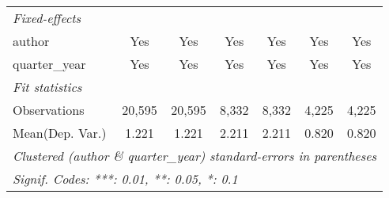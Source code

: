 \begin{tabular}{lcccccc}
   \midrule
   \emph{Fixed-effects}\\
   author                                & Yes           & Yes           & Yes           & Yes           & Yes           & Yes\\  
   quarter\_year                         & Yes           & Yes           & Yes           & Yes           & Yes           & Yes\\  
   \midrule
   \emph{Fit statistics}\\
   Observations                          & 20,595        & 20,595        & 8,332         & 8,332         & 4,225         & 4,225\\  
Mean(Dep. Var.) & 1.221 & 1.221 & 2.211 & 2.211 & 0.820 & 0.820 \\
   \midrule \midrule
   \multicolumn{7}{l}{\emph{Clustered (author \& quarter\_year) standard-errors in parentheses}}\\
   \multicolumn{7}{l}{\emph{Signif. Codes: ***: 0.01, **: 0.05, *: 0.1}}\\
\end{tabular}
\par\endgroup
